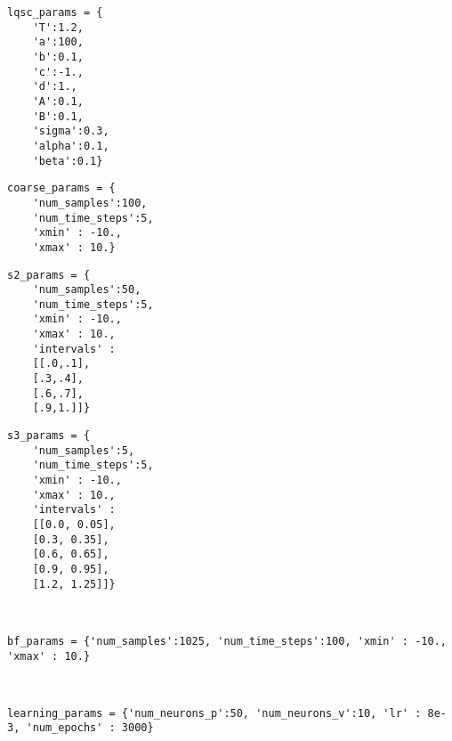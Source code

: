 \documentclass[border=4pt,preview]{standalone}
\begin{document}
\begin{scriptsize}
\begin{minipage}[t]{0.2\textwidth}
\begin{verbatim}
lqsc_params = {
    'T':1.2, 
    'a':100, 
    'b':0.1, 
    'c':-1., 
    'd':1., 
    'A':0.1, 
    'B':0.1, 
    'sigma':0.3, 
    'alpha':0.1, 
    'beta':0.1}
\end{verbatim}   
\end{minipage}
\begin{minipage}[t]{0.25\textwidth}
\begin{verbatim}    
coarse_params = {
    'num_samples':100, 
    'num_time_steps':5, 
    'xmin' : -10., 
    'xmax' : 10.}
\end{verbatim}   
\end{minipage}
\begin{minipage}[t]{0.25\textwidth}
\begin{verbatim} 
s2_params = {
    'num_samples':50, 
    'num_time_steps':5, 
    'xmin' : -10., 
    'xmax' : 10.,
    'intervals' : 
    [[.0,.1], 
    [.3,.4], 
    [.6,.7], 
    [.9,1.]]}   
\end{verbatim}   
\end{minipage}
\begin{minipage}[t]{0.25\textwidth}
\begin{verbatim} 
s3_params = {
    'num_samples':5, 
    'num_time_steps':5, 
    'xmin' : -10., 
    'xmax' : 10.,
    'intervals' : 
    [[0.0, 0.05], 
    [0.3, 0.35], 
    [0.6, 0.65], 
    [0.9, 0.95], 
    [1.2, 1.25]]}   
\end{verbatim}   
\end{minipage}\\
\begin{minipage}[t]{1\textwidth}
\begin{verbatim}     
bf_params = {'num_samples':1025, 'num_time_steps':100, 'xmin' : -10., 'xmax' : 10.}
\end{verbatim}   
\end{minipage}\\
\begin{minipage}{1\textwidth}
\begin{verbatim} 
learning_params = {'num_neurons_p':50, 'num_neurons_v':10, 'lr' : 8e-3, 'num_epochs' : 3000}
\end{verbatim}
\end{minipage}
\end{scriptsize}
\end{document}
